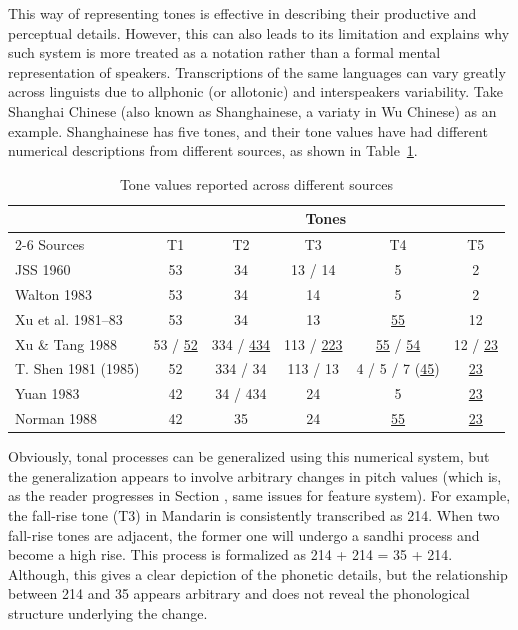 This way of representing tones is effective in describing their productive
and perceptual details. However, this can also leads to its limitation
and explains why such system is more treated as a notation rather than a formal mental representation of speakers. Transcriptions of the same languages can vary greatly across
linguists due to allphonic (or allotonic) and interspeakers variability. 
Take Shanghai Chinese (also known as Shanghainese, a variaty in Wu Chinese) as an example. Shanghainese has five tones, and their tone values have had different numerical
descriptions from different sources, as shown in Table~\ref{tab:shanghai-tones}.

\begin{table}[ht]
\centering
\caption{Tone values reported across different sources}
\label{tab:shanghai-tones}
\begin{tabular}{lccccc}
\toprule
& \multicolumn{5}{c}{Tones} \\
\cmidrule(lr){2-6}
Sources & T1 & T2 & T3 & T4 & T5 \\
\midrule
JSS 1960          & 53              & 34               & 13 / 14           & 5                & 2               \\
Walton 1983       & 53              & 34               & 14                & 5                & 2               \\
Xu et al. 1981--83 & 53             & 34               & 13                & \underline{55}   & 12              \\
Xu \& Tang 1988   & 53 / \underline{52}
                  & 334 / \underline{434}
                  & 113 / \underline{223}
                  & \underline{55} / \underline{54}
                  & 12 / \underline{23} \\
T. Shen 1981 (1985)
                  & 52
                  & 334 / 34
                  & 113 / 13
                  & 4 / 5 / 7 (\underline{45})
                  & \underline{23} \\
Yuan 1983         & 42              & 34 / 434         & 24                & 5                & \underline{23}  \\
Norman 1988       & 42              & 35               & 24                & \underline{55}   & \underline{23}  \\
\bottomrule
\end{tabular}
\end{table}

Obviously, tonal processes can be generalized using this numerical system, but 
the generalization appears to involve arbitrary changes in pitch values (which is, 
as the reader progresses in Section , same issues for feature system). 
For example, the fall-rise tone (T3) in Mandarin is consistently transcribed as 214. 
When two fall-rise tones are adjacent, the former one will undergo a sandhi process
and become a high rise. This process is formalized as 214 + 214 = 35 + 214. 
Although, this gives a clear depiction of the phonetic details, but the relationship 
between 214 and 35 appears arbitrary and does not reveal the phonological structure 
underlying the change. 

